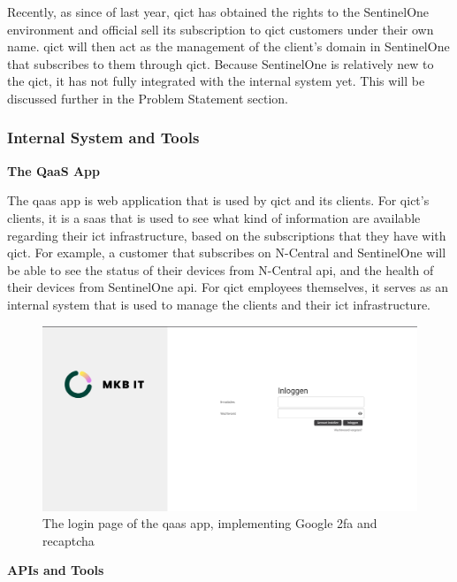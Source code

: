 Recently, as since of last year, \acrshort{qict} has obtained the rights to the SentinelOne environment and official sell its subscription
to \acrshort{qict} customers under their own name. \acrshort{qict} will then act as the management of the client's domain in SentinelOne
that subscribes to them through \acrshort{qict}. Because SentinelOne is relatively new to the \acrshort{qict}, it has not fully integrated
with the internal system yet. This will be discussed further in the Problem Statement section.

\subsubsection{Internal System and Tools}

\textbf{The QaaS App}

The \acrshort{qaas} app is web application that is used by \acrshort{qict} and its clients.
For \acrshort{qict}'s clients, it is a \acrshort{saas} that is used to see what kind of information are available
regarding their \acrshort{ict} infrastructure, based on the subscriptions that they have with \acrshort{qict}.
For example, a customer that subscribes on N-Central and SentinelOne will be able to see the status of their
devices from N-Central \acrshort{api}, and the health of their devices from SentinelOne \acrshort{api}.
For \acrshort{qict} employees themselves, it serves as an internal system that is used to manage the clients and their
\acrshort{ict} infrastructure.

\begin{figure}[H]
      \centering
      \includegraphics[width=1.0\textwidth]{Figures/Qaas App/Landing Page.png}
      \caption{The login page of the \acrshort{qaas} app, implementing Google \acrshort{2fa} and re\acrshort{captcha}}
\end{figure}

\textbf{APIs and Tools}

